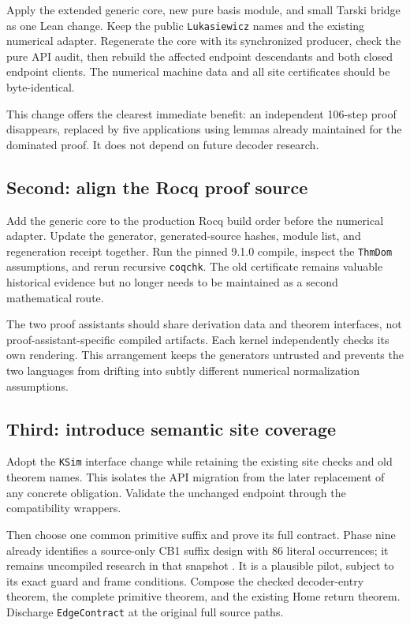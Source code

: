 \documentclass[11pt,letterpaper]{article}
\begin{document}
Apply the extended generic core, new pure basis module, and small Tarski bridge
as one Lean change. Keep the public \texttt{Lukasiewicz} names and the existing
numerical adapter. Regenerate the core with its synchronized producer, check the
pure API audit, then rebuild the affected endpoint descendants and both closed
endpoint clients. The numerical machine data and all site certificates should
be byte-identical.

This change offers the clearest immediate benefit: an independent 106-step
proof disappears, replaced by five applications using lemmas already maintained
for the dominated proof. It does not depend on future decoder research.

\subsection{Second: align the Rocq proof source}

Add the generic core to the production Rocq build order before the numerical
adapter. Update the generator, generated-source hashes, module list, and
regeneration receipt together. Run the pinned 9.1.0 compile, inspect the
\texttt{ThmDom} assumptions, and rerun recursive \texttt{coqchk}. The old
certificate remains valuable historical evidence but no longer needs to be
maintained as a second mathematical route.

The two proof assistants should share derivation data and theorem interfaces,
not proof-assistant-specific compiled artifacts. Each kernel independently
checks its own rendering. This arrangement keeps the generators untrusted and
prevents the two languages from drifting into subtly different numerical
normalization assumptions.

\subsection{Third: introduce semantic site coverage}

Adopt the \texttt{KSim} interface change while retaining the existing site
checks and old theorem names. This isolates the API migration from the later
replacement of any concrete obligation. Validate the unchanged endpoint through
the compatibility wrappers.

Then choose one common primitive suffix and prove its full contract. Phase nine
already identifies a source-only CB1 suffix design with 86 literal occurrences;
it remains uncompiled research in that snapshot \cite{phase9}. It is a plausible
pilot, subject to its exact guard and frame conditions. Compose the checked
decoder-entry theorem, the complete primitive theorem, and the existing Home
return theorem. Discharge \texttt{EdgeContract} at the original full source paths.
\end{document}
